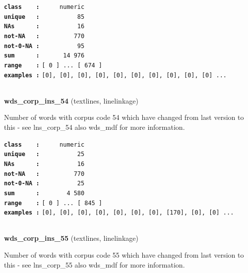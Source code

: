 \documentclass[]{article}
\begin{document}
\textbf{\texttt{class\ \ \ \ :}} \texttt{~~~~~numeric}\\
\textbf{\texttt{unique\ \ \ :}} \texttt{~~~~~~~~~~85}\\
\textbf{\texttt{NAs\ \ \ \ \ \ :}} \texttt{~~~~~~~~~~16}\\
\textbf{\texttt{not-NA\ \ \ :}} \texttt{~~~~~~~~~770}\\
\textbf{\texttt{not-0-NA\ :}} \texttt{~~~~~~~~~~95}\\
\textbf{\texttt{sum\ \ \ \ \ \ :}} \texttt{~~~~~~14~976}\\
\textbf{\texttt{range\ \ \ \ :}}
\texttt{{[}\ 0\ {]}\ ...\ {[}\ 674\ {]}}\\
\textbf{\texttt{examples\ :}}
\texttt{{[}0{]},\ {[}0{]},\ {[}0{]},\ {[}0{]},\ {[}0{]},\ {[}0{]},\ {[}0{]},\ {[}0{]},\ {[}0{]},\ {[}0{]}\ ...}\\

~

\textbf{wds\_corp\_ins\_54} (textlines, linelinkage)

Number of words with corpus code 54 which have changed from last version
to this - see lns\_corp\_54 also wds\_mdf for more information.

\textbf{\texttt{class\ \ \ \ :}} \texttt{~~~~~numeric}\\
\textbf{\texttt{unique\ \ \ :}} \texttt{~~~~~~~~~~25}\\
\textbf{\texttt{NAs\ \ \ \ \ \ :}} \texttt{~~~~~~~~~~16}\\
\textbf{\texttt{not-NA\ \ \ :}} \texttt{~~~~~~~~~770}\\
\textbf{\texttt{not-0-NA\ :}} \texttt{~~~~~~~~~~25}\\
\textbf{\texttt{sum\ \ \ \ \ \ :}} \texttt{~~~~~~~4~580}\\
\textbf{\texttt{range\ \ \ \ :}}
\texttt{{[}\ 0\ {]}\ ...\ {[}\ 845\ {]}}\\
\textbf{\texttt{examples\ :}}
\texttt{{[}0{]},\ {[}0{]},\ {[}0{]},\ {[}0{]},\ {[}0{]},\ {[}0{]},\ {[}0{]},\ {[}170{]},\ {[}0{]},\ {[}0{]}\ ...}\\

~

\textbf{wds\_corp\_ins\_55} (textlines, linelinkage)

Number of words with corpus code 55 which have changed from last version
to this - see lns\_corp\_55 also wds\_mdf for more information.
\end{document}
